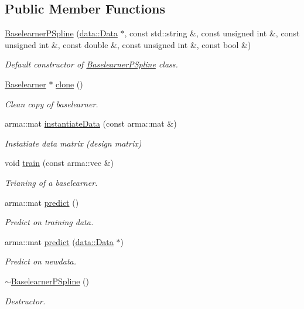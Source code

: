 \subsection*{Public Member Functions}
\begin{DoxyCompactItemize}
\item 
\hyperlink{classblearner_1_1_baselearner_p_spline_af891e692907a085213491c584305fbde}{Baselearner\+P\+Spline} (\hyperlink{classdata_1_1_data}{data\+::\+Data} $\ast$, const std\+::string \&, const unsigned int \&, const unsigned int \&, const double \&, const unsigned int \&, const bool \&)
\begin{DoxyCompactList}\small\item\em Default constructor of {\ttfamily \hyperlink{classblearner_1_1_baselearner_p_spline}{Baselearner\+P\+Spline}} class. \end{DoxyCompactList}\item 
\hyperlink{classblearner_1_1_baselearner}{Baselearner} $\ast$ \hyperlink{classblearner_1_1_baselearner_p_spline_aea7d3c0ef6d77ffb8a2fb2000fae6399}{clone} ()
\begin{DoxyCompactList}\small\item\em Clean copy of baselearner. \end{DoxyCompactList}\item 
arma\+::mat \hyperlink{classblearner_1_1_baselearner_p_spline_a1a83493d31e14f7e28d0aba40a3f4396}{instantiate\+Data} (const arma\+::mat \&)
\begin{DoxyCompactList}\small\item\em Instatiate data matrix (design matrix) \end{DoxyCompactList}\item 
void \hyperlink{classblearner_1_1_baselearner_p_spline_a48935f40abc8b393b674c39f4efcff25}{train} (const arma\+::vec \&)
\begin{DoxyCompactList}\small\item\em Trianing of a baselearner. \end{DoxyCompactList}\item 
arma\+::mat \hyperlink{classblearner_1_1_baselearner_p_spline_a7d170166132a69ad0fb046e4599e0336}{predict} ()
\begin{DoxyCompactList}\small\item\em Predict on training data. \end{DoxyCompactList}\item 
arma\+::mat \hyperlink{classblearner_1_1_baselearner_p_spline_a241485cc3e932c45564370a0881e3772}{predict} (\hyperlink{classdata_1_1_data}{data\+::\+Data} $\ast$)
\begin{DoxyCompactList}\small\item\em Predict on newdata. \end{DoxyCompactList}\item 
\hyperlink{classblearner_1_1_baselearner_p_spline_a52c77efff22f6da5fd058eb36da24141}{$\sim$\+Baselearner\+P\+Spline} ()
\begin{DoxyCompactList}\small\item\em Destructor. \end{DoxyCompactList}\end{DoxyCompactItemize}
